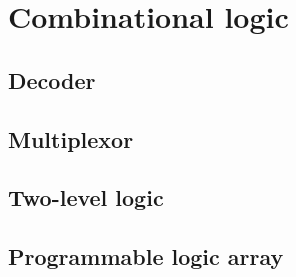         
    \section{Combinational logic}\label{section:Combinational_logic}
        
        \subsection{Decoder}
        
        \subsection{Multiplexor}
        
        \subsection{Two-level logic}
        
        \subsection{Programmable logic array}